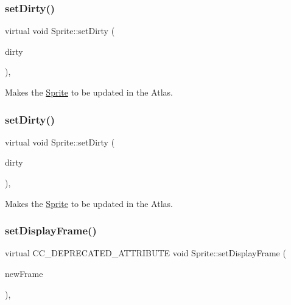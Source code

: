 \mbox{\label{classSprite_a7e621efdc4116feff17eba4ff93dcead}} 
\subsubsection{\texorpdfstring{set\+Dirty()}{setDirty()}\hspace{0.1cm}{\footnotesize\ttfamily [1/2]}}
{\footnotesize\ttfamily virtual void Sprite\+::set\+Dirty (\begin{DoxyParamCaption}\item[{bool}]{dirty }\end{DoxyParamCaption})\hspace{0.3cm}{\ttfamily [inline]}, {\ttfamily [virtual]}}

Makes the \hyperlink{classSprite}{Sprite} to be updated in the Atlas. \mbox{\label{classSprite_a7e621efdc4116feff17eba4ff93dcead}} 
\subsubsection{\texorpdfstring{set\+Dirty()}{setDirty()}\hspace{0.1cm}{\footnotesize\ttfamily [2/2]}}
{\footnotesize\ttfamily virtual void Sprite\+::set\+Dirty (\begin{DoxyParamCaption}\item[{bool}]{dirty }\end{DoxyParamCaption})\hspace{0.3cm}{\ttfamily [inline]}, {\ttfamily [virtual]}}

Makes the \hyperlink{classSprite}{Sprite} to be updated in the Atlas. \mbox{\label{classSprite_adb32a70df269965d534e49600ab9ff13}} 
\subsubsection{\texorpdfstring{set\+Display\+Frame()}{setDisplayFrame()}\hspace{0.1cm}{\footnotesize\ttfamily [1/2]}}
{\footnotesize\ttfamily virtual C\+C\+\_\+\+D\+E\+P\+R\+E\+C\+A\+T\+E\+D\+\_\+\+A\+T\+T\+R\+I\+B\+U\+TE void Sprite\+::set\+Display\+Frame (\begin{DoxyParamCaption}\item[{\hyperlink{classSpriteFrame}{Sprite\+Frame} $\ast$}]{new\+Frame }\end{DoxyParamCaption})\hspace{0.3cm}{\ttfamily [inline]}, {\ttfamily [virtual]}}

